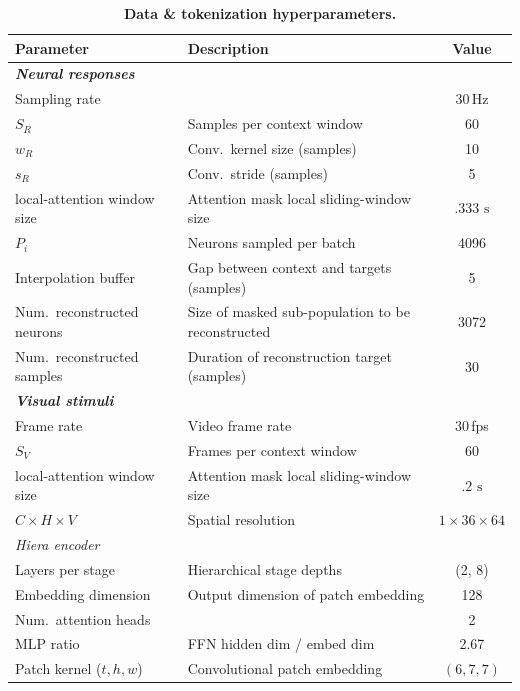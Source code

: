 \documentclass{article} %
\begin{document}
\begin{table}[H]
\centering
\caption{\textbf{Data \& tokenization hyperparameters.}}
\label{tab:hparams_tokenization}
\vspace{4pt}
\small
\renewcommand{\arraystretch}{1.15}
\begin{tabular}{llc}
\toprule
\textbf{Parameter} & \textbf{Description} & \textbf{Value} \\
\midrule
\multicolumn{3}{l}{\textit{\textbf{Neural responses}}} \\
\quad Sampling rate & & 30\,Hz \\
\quad $S_R$ & Samples per context window & 60 \\
\quad $w_R$ & Conv.\ kernel size (samples) & 10 \\
\quad $s_R$ & Conv.\ stride (samples) & 5 \\
\quad local-attention window size & Attention mask local sliding-window size & $.333 \text{ s}$ \\
\quad $P_i$ & Neurons sampled per batch & 4096 \\
\quad Interpolation buffer & Gap between context and targets (samples) & 5 \\
\quad Num.\ reconstructed neurons & Size of masked sub-population to be reconstructed & 3072 \\
\quad Num.\ reconstructed samples & Duration of reconstruction target (samples) & 30 \\
\midrule
\multicolumn{3}{l}{\textit{\textbf{Visual stimuli}}} \\
\quad Frame rate & Video frame rate & 30\,fps \\
\quad $S_V$ & Frames per context window & 60 \\
\quad local-attention window size & Attention mask local sliding-window size & $.2 \text{ s}$ \\
\quad $C \times H \times V$ & Spatial resolution & $1 \times 36 \times 64$ \\
\multicolumn{3}{l}{\quad \textit{Hiera encoder}} \\
\quad\quad Layers per stage & Hierarchical stage depths & (2, 8) \\
\quad\quad Embedding dimension & Output dimension of patch embedding & 128 \\
\quad\quad Num.\ attention heads & & 2 \\
\quad\quad MLP ratio & FFN hidden dim / embed dim & 2.67 \\
\quad\quad Patch kernel ($t, h, w$) & Convolutional patch embedding & $(6, 7, 7)$ \\

\end{tabular}
\end{table}
\end{document}
